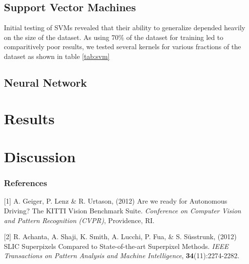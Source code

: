\documentclass{article} %
\begin{document}
\subsection{Support Vector Machines}

Initial testing of SVMs revealed that their ability to generalize depended heavily on the size of the dataset. As using 70\% of the dataset for training led to comparitively poor results, we tested several kernels for various fractions of the dataset as shown in table \ref{tab:svm}

\begin{table}[ht!]
 \begin{tabular}{c | c 
  
 \end{tabular}
\end{table}


\subsection{Neural Network}

\section{Results}\label{sec:results}

\section{Discussion}

\subsubsection*{References}

% 
% 
\small{
[1] A. Geiger, P. Lenz \& R. Urtason, (2012) Are we ready for Autonomous Driving? The KITTI Vision Benchmark Suite. {\it Conference on Computer Vision and Pattern Recognition (CVPR)}, Providence, RI.

[2] R. Achanta, A. Shaji, K. Smith, A. Lucchi, P. Fua, \& S. Süsstrunk, (2012) SLIC Superpixels Compared to State-of-the-art Superpixel Methods. {\it IEEE Transactions on Pattern Analysis and Machine Intelligence}, {\bf 34}(11):2274-2282.

}
\end{document}
